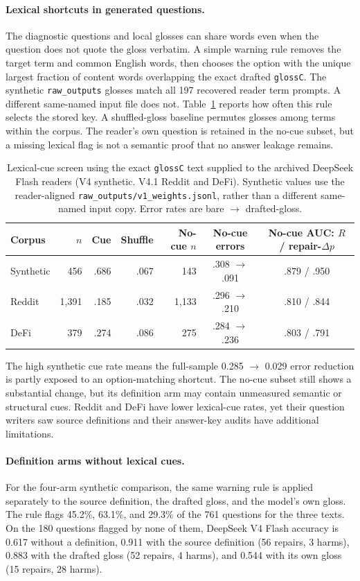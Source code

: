 \paragraph{Lexical shortcuts in generated questions.}\label{app:lexical-cues}
The diagnostic questions and local glosses can share words even when the question does not quote the gloss verbatim. A simple warning rule removes the target term and common English words, then chooses the option with the unique largest fraction of content words overlapping the exact drafted \texttt{glossC}. The synthetic \texttt{raw\_outputs} glosses match all 197 recovered reader term prompts. A different same-named input file does not. Table~\ref{tab:lexical-cues} reports how often this rule selects the stored key. A shuffled-gloss baseline permutes glosses among terms within the corpus. The reader's own question is retained in the no-cue subset, but a missing lexical flag is not a semantic proof that no answer leakage remains.

\begin{table}[h]\centering\footnotesize
\caption{Lexical-cue screen using the exact \texttt{glossC} text supplied to the archived DeepSeek Flash readers (V4 synthetic. V4.1 Reddit and DeFi). Synthetic values use the reader-aligned \texttt{raw\_outputs/v1\_weights.jsonl}, rather than a different same-named input copy. Error rates are bare $\to$ drafted-gloss.}
\label{tab:lexical-cues}
\begin{tabular}{@{}lrrrrcc@{}}\toprule
Corpus & $n$ & Cue & Shuffle & No-cue $n$ & No-cue errors & No-cue AUC: $R$ / repair-$\Delta p$\\\midrule
Synthetic & 456 & .686 & .067 & 143 & .308 $\to$ .091 & .879 / .950\\
Reddit & 1,391 & .185 & .032 & 1,133 & .296 $\to$ .210 & .810 / .844\\
DeFi & 379 & .274 & .086 & 275 & .284 $\to$ .236 & .803 / .791\\\bottomrule
\end{tabular}
\end{table}

The high synthetic cue rate means the full-sample 0.285 $\to$ 0.029 error reduction is partly exposed to an option-matching shortcut. The no-cue subset still shows a substantial change, but its definition arm may contain unmeasured semantic or structural cues. Reddit and DeFi have lower lexical-cue rates, yet their question writers saw source definitions and their answer-key audits have additional limitations.

\paragraph{Definition arms without lexical cues.}
For the four-arm synthetic comparison, the same warning rule is applied separately to the source definition, the drafted gloss, and the model's own gloss. The rule flags 45.2\%, 63.1\%, and 29.3\% of the 761 questions for the three texts. On the 180 questions flagged by none of them, DeepSeek V4 Flash accuracy is 0.617 without a definition, 0.911 with the source definition (56 repairs, 3 harms), 0.883 with the drafted gloss (52 repairs, 4 harms), and 0.544 with its own gloss (15 repairs, 28 harms).
